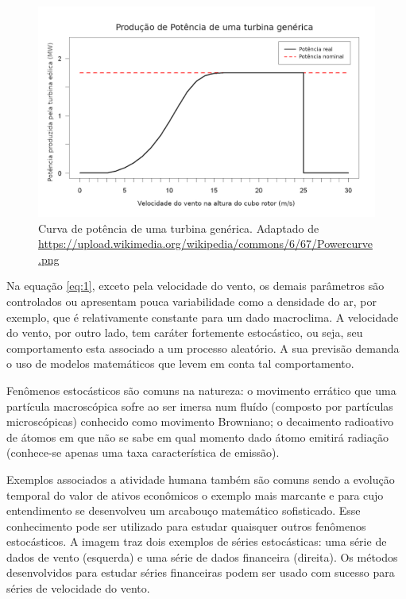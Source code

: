 \documentclass[
	12pt,				%
	openright,			%
	oneside,			%
	a4paper,			%
	english,			%
	french,				%
	spanish,			%
	brazil				%
	]{abntex2}
\begin{document}
\begin{figure}[h]
    \centering
	\includegraphics[width=\textwidth]{powercurve}
	\caption{Curva de potência de uma turbina genérica. Adaptado de \url{https://upload.wikimedia.org/wikipedia/commons/6/67/Powercurve.png}}
\end{figure}
\FloatBarrier

Na equação \ref{eq:1}, exceto pela velocidade do vento, os demais parâmetros são controlados ou apresentam pouca variabilidade como a densidade do ar, por exemplo, que é relativamente constante para um dado macroclima. A velocidade do vento, por outro lado, tem caráter fortemente estocástico, ou seja, seu comportamento esta associado a um processo aleatório. A sua previsão demanda o uso de modelos matemáticos que levem em conta tal comportamento.

Fenômenos estocásticos são comuns na natureza: o movimento errático que uma partícula macroscópica sofre ao ser 
imersa num fluído (composto por partículas microscópicas) conhecido como movimento Browniano; o decaimento radioativo de átomos em que não se sabe em qual momento dado átomo emitirá radiação (conhece-se apenas uma taxa característica de emissão). 

Exemplos associados a atividade humana também são comuns sendo a evolução temporal do valor de ativos econômicos o exemplo mais marcante e para cujo entendimento se desenvolveu um arcabouço matemático sofisticado. Esse conhecimento pode ser utilizado para estudar quaisquer outros fenômenos estocásticos. A imagem traz dois exemplos de séries estocásticas: uma série de dados de vento (esquerda) e uma série de dados financeira (direita). Os métodos desenvolvidos para estudar séries financeiras podem ser usado com sucesso para séries de velocidade do vento.
\end{document}
